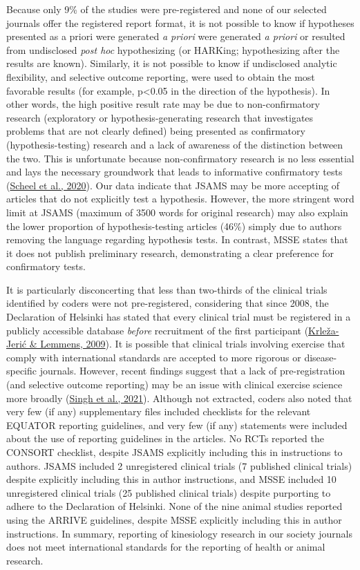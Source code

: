 \documentclass[]{cik}%
\begin{document}
Because only 9\% of the studies were pre-registered and none of our
selected journals offer the registered report format, it is not possible
to know if hypotheses presented as a priori were generated \emph{a
priori} were generated \emph{a priori} or resulted from undisclosed
\emph{post hoc} hypothesizing (or HARKing; hypothesizing after the
results are known). Similarly, it is not possible to know if undisclosed
analytic flexibility, and selective outcome reporting, were used to
obtain the most favorable results (for example, p\textless0.05 in the
direction of the hypothesis). In other words, the high positive result
rate may be due to non-confirmatory research (exploratory or
hypothesis-generating research that investigates problems that are not
clearly defined) being presented as confirmatory (hypothesis-testing)
research and a lack of awareness of the distinction between the two.
This is unfortunate because non-confirmatory research is no less
essential and lays the necessary groundwork that leads to informative
confirmatory tests (\protect\hyperlink{ref-Scheel2020}{Scheel et al.,
2020}). Our data indicate that JSAMS may be more accepting of articles
that do not explicitly test a hypothesis. However, the more stringent
word limit at JSAMS (maximum of 3500 words for original research) may
also explain the lower proportion of hypothesis-testing articles (46\%)
simply due to authors removing the language regarding hypothesis tests.
In contrast, MSSE states that it does not publish preliminary research,
demonstrating a clear preference for confirmatory tests.

It is particularly disconcerting that less than two-thirds of the
clinical trials identified by coders were not pre-registered,
considering that since 2008, the Declaration of Helsinki has stated that
every clinical trial must be registered in a publicly accessible
database \emph{before} recruitment of the first participant
(\protect\hyperlink{ref-KrleaJeri2009}{Krleža-Jerić \& Lemmens, 2009}).
It is possible that clinical trials involving exercise that comply with
international standards are accepted to more rigorous or
disease-specific journals. However, recent findings suggest that a lack
of pre-registration (and selective outcome reporting) may be an issue
with clinical exercise science more broadly
(\protect\hyperlink{ref-Singh2021}{Singh et al., 2021}). Although not
extracted, coders also noted that very few (if any) supplementary files
included checklists for the relevant EQUATOR reporting guidelines, and
very few (if any) statements were included about the use of reporting
guidelines in the articles. No RCTs reported the CONSORT checklist,
despite JSAMS explicitly including this in instructions to authors.
JSAMS included 2 unregistered clinical trials (7 published clinical
trials) despite explicitly including this in author instructions, and
MSSE included 10 unregistered clinical trials (25 published clinical
trials) despite purporting to adhere to the Declaration of Helsinki.
None of the nine animal studies reported using the ARRIVE guidelines,
despite MSSE explicitly including this in author instructions. In
summary, reporting of kinesiology research in our society journals does
not meet international standards for the reporting of health or animal
research.
\end{document}
